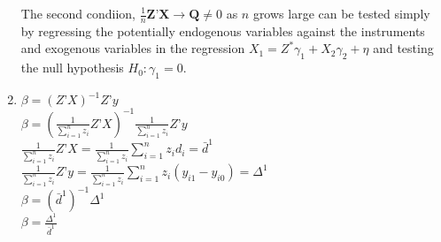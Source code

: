 \documentclass{article}
\begin{document}
\begin{enumerate}[label=(\alph*)]
	The second condiion, $\frac{1}{n}\mathbf{Z}’\mathbf{X} \rightarrow \mathbf{Q} \neq 0$ as $n$ grows large can be tested simply by regressing the potentially endogenous variables against the instruments and exogenous variables in the regression $X_{1} = Z^{*}\gamma_{1} + X_{2}\gamma_{2} + \eta$ and testing the null hypothesis $H_{0}: \gamma_{1} = 0$.
	
	\item
	$\beta=(Z’X)^{-1}Z’y$ \\ [4pt]
	$\beta=(\frac{1}{\sum_{i=1}^{n}z_{i}}Z’X)^{-1}\frac{1}{\sum_{i=1}^{n}z_{i}}Z’y$ \\ [4pt]
	$\frac{1}{\sum_{i=1}^{n}z_{i}}Z’X = \frac{1}{\sum_{i=1}^{n}z_{i}}\sum^{n}_{i=1}z_{i}d_{i} = \bar{d}^{1}$ \\ [4pt]
	$\frac{1}{\sum_{i=1}^{n}z_{i}}Z’y = \frac{1}{\sum_{i=1}^{n}z_{i}}\sum^{n}_{i=1}z_{i}(y_{i1}-y_{i0}) = \Delta^{1}$ \\[4pt]
	$\beta = (\bar{d}^{1})^{-1}\Delta^{1}$ \\ [4pt]
	$\beta = \frac{\Delta^{1}}{\bar{d}^{1}}$ \\ [4pt]
	
\end{enumerate}
\end{document}
